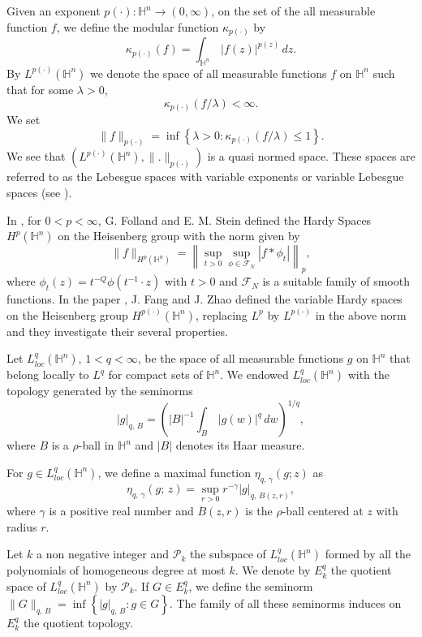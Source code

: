 \documentclass[oneside,10pt]{article}
\begin{document}
Given an exponent $p(\cdot): \mathbb{H}^{n} \rightarrow (0, \infty)$, on the set of the all measurable function $f$, we define the modular function $\kappa_{p(\cdot)}$ by
\begin{equation} \label{mod}
\kappa_{p(\cdot)}(f) = \int_{\mathbb{H}^{n}} \, |f(z)|^{p(z)} \, dz.
\end{equation}
By $L^{p(\cdot)}(\mathbb{H}^{n})$ we denote the space of all measurable functions $f$ 
on $\mathbb{H}^n$ such that for some $\lambda > 0$,
\[
\kappa_{p(\cdot)}(f/\lambda) < \infty.
\] 
We set 
\[
\| f \|_{p(\cdot)} = \inf \left\{ \lambda > 0 : \kappa_{p(\cdot)}(f/\lambda) \leq 1 \right\}.
\]
We see that $\left( L^{p(\cdot)}(\mathbb{H}^{n}), \| . \|_{p(\cdot)} \right)$ is a quasi normed space.
These spaces are referred to as the Lebesgue spaces with variable exponents or variable Lebesgue spaces (see \cite{diening}).

In \cite{Foll-St}, for $0 < p < \infty$, G. Folland and E. M. Stein defined the Hardy Spaces $H^{p}(\mathbb{H}^{n})$ on the Heisenberg group with the norm given by
\[
\| f \|_{H^{p}(\mathbb{H}^{n})} = \left\| \sup_{t>0} \sup_{\phi \in \mathcal{F}_{N}} \left| f \ast \phi_t \right| \right\|_{p},
\]
where $\phi_t(z) = t^{-Q} \phi(t^{-1} \cdot z)$ with $t > 0$ and $\mathcal{F}_{N}$ is a suitable family of smooth functions. In the paper \cite{Fang}, J. Fang and J. Zhao defined the variable Hardy spaces on the Heisenberg group $H^{p(\cdot)}(\mathbb{H}^{n})$, replacing $L^{p}$ by $L^{p(\cdot)}$ in the above norm and they investigate their several properties.

Let $L^{q}_{loc}(\mathbb{H}^{n})$, $1 < q < \infty$, be the space of all measurable functions $g$ on $\mathbb{H}^{n}$ that belong locally to $L^{q}$ for compact sets of $\mathbb{H}^{n}$. We endowed $L^{q}_{loc}(\mathbb{H}^{n})$ with the topology generated by the seminorms
$$|g|_{q, \, B} = \left( |B|^{-1} \int_{B} \, |g(w)|^{q}\, dw \right)^{1/q},$$ where $B$ is a $\rho$-ball in $\mathbb{H}^{n}$ and $|B|$ denotes its Haar measure.

For $g \in L^{q}_{loc}(\mathbb{H}^{n})$, we define a maximal function $\eta_{q, \, \gamma}(g; z)$ as
\begin{equation} \label{etamax}
\eta_{q, \, \gamma}(g; \, z) = \sup_{r > 0} r^{-\gamma} |g|_{q, \, B(z, r)},
\end{equation}
where $\gamma$ is a positive real number and $B(z, r)$ is the $\rho$-ball centered at $z$ with radius $r$.

Let $k$ a non negative integer and $\mathcal{P}_{k}$ the subspace of $L^{q}_{loc}(\mathbb{H}^{n})$ formed by all the polynomials of homogeneous degree at most $k$. We denote by $E^{q}_{k}$ the quotient space of $L^{q}_{loc}(\mathbb{H}^{n})$ by $\mathcal{P}_{k}$. If 
$G \in E^{q}_{k}$, we define the seminorm $\| G \|_{q, \, B} = \inf \left\{ |g|_{q, \, B} : g \in G \right\}$. The family of all these seminorms induces on $E^{q}_{k}$ the quotient topology.
\end{document}
